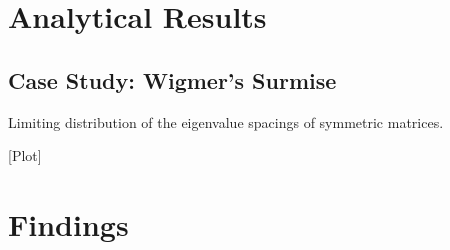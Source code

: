 
\section{Analytical Results}


\subsection{Case Study: Wigmer's Surmise}

Limiting distribution of the eigenvalue spacings of symmetric matrices.

[Plot]


\section{Findings}
